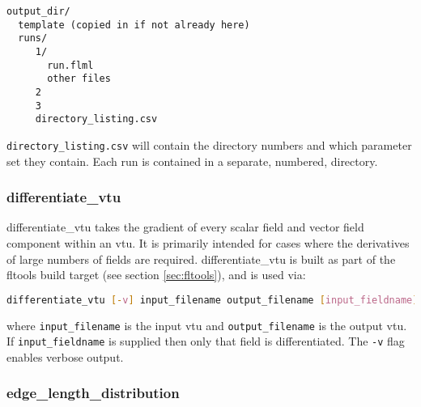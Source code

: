 \begin{lstlisting}
output_dir/
  template (copied in if not already here)
  runs/
     1/
       run.flml
       other files
     2
     3
     directory_listing.csv
\end{lstlisting}

\lstinline[language = Bash]+directory_listing.csv+ will contain the directory numbers and which parameter set they contain. Each run is contained in a separate, numbered, directory.


\subsubsection{differentiate\_vtu}
\label{sec:differentiate_vtu}

differentiate\_vtu takes the gradient of every scalar field and vector field
component within an vtu. It is primarily intended for cases where the derivatives
of large numbers of fields are required. differentiate\_vtu is built as part of the fltools
build target (see section \ref{sec:fltools}), and is used via:

\begin{lstlisting}[language = Bash]
differentiate_vtu [-v] input_filename output_filename [input_fieldname]
\end{lstlisting}

where \lstinline[language = Bash]+input_filename+ is the input vtu and
\lstinline[language = Bash]+output_filename+ is the output vtu. If
\lstinline[language = Bash]+input_fieldname+ is supplied then only that field
is differentiated. The \lstinline[language = Bash]+-v+ flag enables verbose output.


\subsubsection{edge\_length\_distribution}
\label{sec:edgelengthdist}

